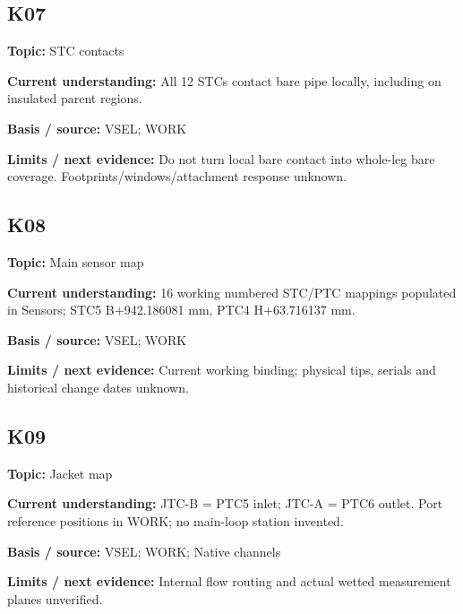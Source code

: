 \documentclass[11pt]{article}
\begin{document}
\par\noindent\begin{minipage}{\textwidth}\small\setlength{\parskip}{2pt}
\subsection*{K07}
\textbf{Topic:} STC contacts\par
\textbf{Current understanding:} All 12 STCs contact bare pipe locally, including on insulated parent regions.\par
\textbf{Basis / source:} VSEL; WORK\par
\textbf{Limits / next evidence:} Do not turn local bare contact into whole-leg bare coverage. Footprints/windows/attachment response unknown.\par
\end{minipage}\par\vspace{5pt}
\par\noindent\begin{minipage}{\textwidth}\small\setlength{\parskip}{2pt}
\subsection*{K08}
\textbf{Topic:} Main sensor map\par
\textbf{Current understanding:} 16 working numbered STC/PTC mappings populated in Sensors; STC5 B+942.186081 mm, PTC4 H+63.716137 mm.\par
\textbf{Basis / source:} VSEL; WORK\par
\textbf{Limits / next evidence:} Current working binding; physical tips, serials and historical change dates unknown.\par
\end{minipage}\par\vspace{5pt}
\par\noindent\begin{minipage}{\textwidth}\small\setlength{\parskip}{2pt}
\subsection*{K09}
\textbf{Topic:} Jacket map\par
\textbf{Current understanding:} JTC-B = PTC5 inlet; JTC-A = PTC6 outlet. Port reference positions in WORK; no main-loop station invented.\par
\textbf{Basis / source:} VSEL; WORK; Native channels\par
\textbf{Limits / next evidence:} Internal flow routing and actual wetted measurement planes unverified.\par
\end{minipage}\par\vspace{5pt}
\end{document}
